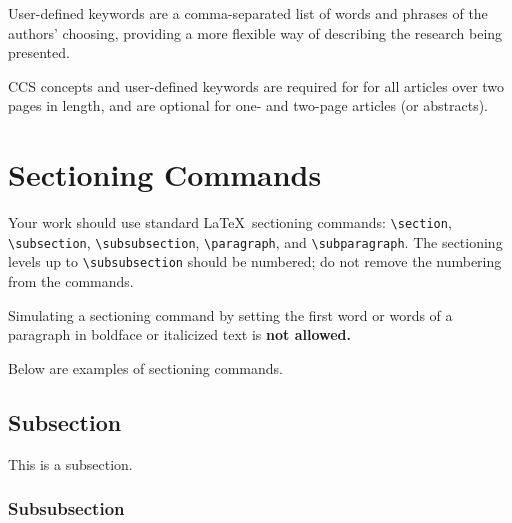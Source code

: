 \documentclass[sigconf,review]{acmart}
\begin{document}
User-defined keywords are a comma-separated list of words and phrases
of the authors' choosing, providing a more flexible way of describing
the research being presented.

CCS concepts and user-defined keywords are required for for all
articles over two pages in length, and are optional for one- and
two-page articles (or abstracts).

\section{Sectioning Commands}

Your work should use standard \LaTeX\ sectioning commands:
\verb|\section|, \verb|\subsection|, \verb|\subsubsection|,
\verb|\paragraph|, and \verb|\subparagraph|. The sectioning levels up to
\verb|\subsubsection| should be numbered; do not remove the numbering
from the commands.

Simulating a sectioning command by setting the first word or words of
a paragraph in boldface or italicized text is {\bfseries not allowed.}

Below are examples of sectioning commands.

\subsection{Subsection}
\label{sec:subsection}

This is a subsection.

\subsubsection{Subsubsection}
\label{sec:subsubsection}
\end{document}
